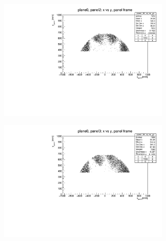 \begin{figure}[!h]
\begin{subfigure}[b]{0.4\textwidth}
        \label{fig:panel1plane0}
    \end{subfigure}
    \hfill
    \begin{subfigure}[b]{0.4\textwidth}
        \centering
        \includegraphics[width=0.95\textwidth]{figures/pdf/plane0_panel2_x_vs_y_all.pdf}
        \label{fig:panel2plane0}
    \end{subfigure}
    \hfill
    \begin{subfigure}[b]{0.4\textwidth}
        \centering
        \includegraphics[width=0.95\textwidth]{figures/pdf/plane0_panel3_x_vs_y_all.pdf}
        \label{fig:panel3plane0}
    \end{subfigure}
    \hfill
    \begin{subfigure}[b]{0.4\textwidth}
        \centering

\end{subfigure}
\end{figure}
